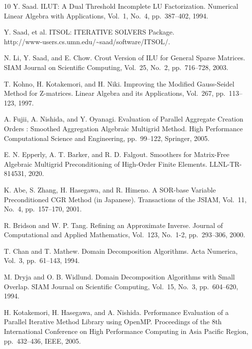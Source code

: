 \documentclass[a4paper]{jarticle}
\begin{document}
{{\begin{thebibliography}{10}
Y. Saad.
\newblock ILUT: A Dual Threshold Incomplete LU Factorization.
\newblock Numerical Linear Algebra with Applications, Vol.~1, No.~4, pp.\ 387--402, 1994. 

Y. Saad, et al.
\newblock ITSOL: ITERATIVE SOLVERS Package. \\
\newblock http://www-users.cs.umn.edu/\textasciitilde saad/software/ITSOL/.

N. Li, Y. Saad, and E. Chow.
\newblock Crout Version of ILU for General Sparse Matrices.
\newblock SIAM Journal on Scientific Computing, Vol.~25, No.~2, pp.\ 716--728, 2003. 

T. Kohno, H. Kotakemori, and H. Niki.
\newblock Improving the Modified Gauss-Seidel Method for Z-matrices.
\newblock Linear Algebra and its Applications, Vol.~267, pp.\ 113--123, 1997.

A. Fujii, A. Nishida, and Y. Oyanagi.
\newblock Evaluation of Parallel Aggregate Creation Orders : Smoothed Aggregation Algebraic Multigrid Method.
\newblock High Performance Computational Science and Engineering, pp.\ 99--122, Springer, 2005. 

E. N. Epperly, A. T. Barker, and R. D. Falgout.
\newblock Smoothers for Matrix-Free Algebraic Multigrid Preconditioning of High-Order Finite Elements.
\newblock LLNL-TR-814531, 2020.

K. Abe, S. Zhang, H. Hasegawa, and R. Himeno.
\newblock A SOR-base Variable Preconditioned CGR Method (in Japanese).
\newblock Transactions of the JSIAM,  Vol.~11, No.~4, pp.\ 157--170, 2001.

R. Bridson and W. P. Tang.
\newblock Refining an Approximate Inverse.
\newblock Journal of Computational and Applied Mathematics, Vol.~123, No.~1-2, pp.\ 293--306, 2000. 

T. Chan and T. Mathew.
\newblock Domain Decomposition Algorithms.
\newblock Acta Numerica, Vol.~3, pp.\ 61--143, 1994. 

M. Dryja and O. B. Widlund.
\newblock Domain Decomposition Algorithms with Small Overlap.
\newblock SIAM Journal on Scientific Computing, Vol.~15, No.~3, pp.\ 604--620, 1994.

H. Kotakemori, H. Hasegawa, and A. Nishida.
\newblock Performance Evaluation of a Parallel Iterative Method Library using OpenMP.
\newblock Proceedings of the 8th International Conference on High
	Performance Computing in Asia Pacific Region, pp.\ 432--436, IEEE, 2005.


\end{thebibliography}}}
\end{document}
